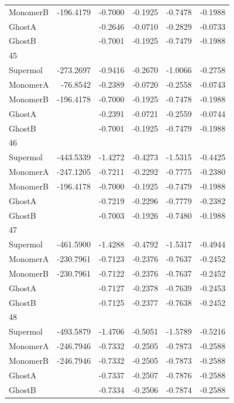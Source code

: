 \documentclass[journal=jctcce,manuscript=article]{achemso}
\begin{document}
\begin{spacing}{1}
\begin{longtable}{lRRRRR}
    MonomerB & -196.4179 & -0.7000 & -0.1925 & -0.7478 & -0.1988 \\
    GhostA &  & -0.2646 & -0.0710 & -0.2829 & -0.0733 \\
    GhostB &  & -0.7001 & -0.1925 & -0.7479 & -0.1988 \\
    45 &  &  &  &  &  \\
    Supermol & -273.2697 & -0.9416 & -0.2670 & -1.0066 & -0.2758 \\
    MonomerA & -76.8542 & -0.2389 & -0.0720 & -0.2558 & -0.0743 \\
    MonomerB & -196.4178 & -0.7000 & -0.1925 & -0.7478 & -0.1988 \\
    GhostA &  & -0.2391 & -0.0721 & -0.2559 & -0.0744 \\
    GhostB &  & -0.7001 & -0.1925 & -0.7479 & -0.1988 \\
    46 &  &  &  &  &  \\
    Supermol & -443.5339 & -1.4272 & -0.4273 & -1.5315 & -0.4425 \\
    MonomerA & -247.1205 & -0.7211 & -0.2292 & -0.7775 & -0.2380 \\
    MonomerB & -196.4178 & -0.7000 & -0.1925 & -0.7479 & -0.1988 \\
    GhostA &  & -0.7219 & -0.2296 & -0.7779 & -0.2382 \\
    GhostB &  & -0.7003 & -0.1926 & -0.7480 & -0.1988 \\
    47 &  &  &  &  &  \\
    Supermol & -461.5900 & -1.4288 & -0.4792 & -1.5317 & -0.4944 \\
    MonomerA & -230.7961 & -0.7123 & -0.2376 & -0.7637 & -0.2452 \\
    MonomerB & -230.7961 & -0.7122 & -0.2376 & -0.7637 & -0.2452 \\
    GhostA &  & -0.7127 & -0.2378 & -0.7639 & -0.2453 \\
    GhostB &  & -0.7125 & -0.2377 & -0.7638 & -0.2452 \\
    48 &  &  &  &  &  \\
    Supermol & -493.5879 & -1.4706 & -0.5051 & -1.5789 & -0.5216 \\
    MonomerA & -246.7946 & -0.7332 & -0.2505 & -0.7873 & -0.2588 \\
    MonomerB & -246.7946 & -0.7332 & -0.2505 & -0.7873 & -0.2588 \\
    GhostA &  & -0.7337 & -0.2507 & -0.7876 & -0.2588 \\
    GhostB &  & -0.7334 & -0.2506 & -0.7874 & -0.2588 \\

\end{longtable}
\end{spacing}
\end{document}
